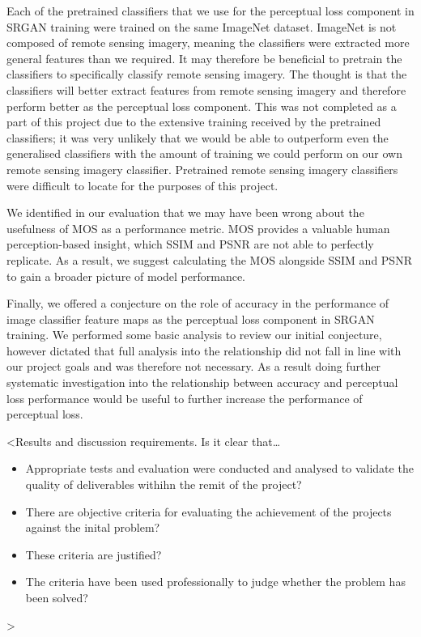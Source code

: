 Each of the pretrained classifiers that we use for the perceptual loss component in SRGAN training were trained on the same ImageNet dataset. ImageNet is not composed of remote sensing imagery, meaning the classifiers were extracted more general features than we required. It may therefore be beneficial to pretrain the classifiers to specifically classify remote sensing imagery. The thought is that the classifiers will better extract features from remote sensing imagery and therefore perform better as the perceptual loss component. This was not completed as a part of this project due to the extensive training received by the pretrained classifiers; it was very unlikely that we would be able to outperform even the generalised classifiers with the amount of training we could perform on our own remote sensing imagery classifier. Pretrained remote sensing imagery classifiers were difficult to locate for the purposes of this project.

We identified in our evaluation that we may have been wrong about the usefulness of MOS as a performance metric. MOS provides a valuable human perception-based insight, which SSIM and PSNR are not able to perfectly replicate. As a result, we suggest calculating the MOS alongside SSIM and PSNR to gain a broader picture of model performance.

Finally, we offered a conjecture on the role of accuracy in the performance of image classifier feature maps as the perceptual loss component in SRGAN training. We performed some basic analysis to review our initial conjecture, however dictated that full analysis into the relationship did not fall in line with our project goals and was therefore not necessary. As a result doing further systematic investigation into the relationship between accuracy and perceptual loss performance would be useful to further increase the performance of perceptual loss.

<Results and discussion requirements. Is it clear that\dots
\begin{itemize}
    \item Appropriate tests and evaluation were conducted and analysed to validate the quality of deliverables withihn the remit of the project?
    \item There are objective criteria for evaluating the achievement of the projects against the inital problem?
    \item These criteria are justified?
    \item The criteria have been used professionally to judge whether the problem has been solved?
\end{itemize}
>